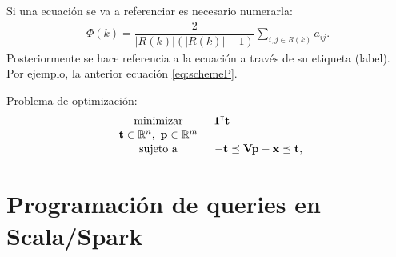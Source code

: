 \documentclass[12pt,twoside,titlepage]{report}
\newcommand{\transpuesta}{\mbox{\tiny $\mathsf{T}$}}
\begin{document}
Si una ecuación se va a referenciar es necesario numerarla:
\begin{eqnarray}
\label{eq:schemeP}
 \Phi (k)=\dfrac{2}{|R(k)|(|R(k)|-1)} \underset{i,j \in R(k)}{\sum} a_{ij}.
\end{eqnarray}
Posteriormente se hace referencia a la ecuación a través de su etiqueta (label). Por ejemplo, la anterior ecuación \eqref{eq:schemeP}.



Problema de optimización:
\begin{equation}\label{eq:LP1}
\begin{array}{cl}
  \displaystyle \begin{array}{c}\mathrm{minimizar} \\ \mathbf{t} \in \mathbb{R}^{n}, \  \mathbf{p} \in \mathbb{R}^{m} \end{array} & \hspace{-0.2cm} \begin{array}{c} \mathbf{1}^{\transpuesta}\mathbf{t} \\ \mbox{} \end{array}  \\
  & \vspace{-0.4cm} \\ %
  \mbox{sujeto a} & -\mathbf{t} \preceq  \mathbf{V}\mathbf{p} - \mathbf{x}  \preceq  \mathbf{t},\\
 \end{array}
\end{equation}




\section{Programación de queries en Scala/Spark}
\end{document}
